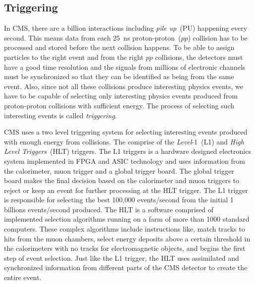 \subsection{Triggering}
In CMS, there are a billion interactions including \textit{pile up}~(PU) happening every second. This means data from each 25~ns proton-proton~($pp$) collision has to be processed and stored before the next collision happens.  To be able to assign particles to the right event and from the right  $pp$ collisions, the detectors must have a good time resolution and the signals from millions of electronic channels must be synchronized so  that they can be identified as being from the same event.
Also, since not all these collisions produce interesting physics events, we have to be capable of selecting only interesting physics events produced from proton-proton collisions with sufficient  energy. The process of selecting such interesting events is called \textit{triggering}.
\par 
CMS uses a two level triggering system for selecting interesting events produced with enough energy from collisions.
The comprise of the \textit{Level}-1~(L1) and \textit{High Level Triggers}~(HLT) triggers.
\newline
The L1 triggers is a hardware designed electronics system implemented in FPGA and ASIC technology and uses information from the calorimeter, muon trigger and a global trigger board. The global trigger board makes the final decision based on the calorimeter and muon triggers to reject or keep an event for further processing at the HLT trigger. The L1 trigger is responsible for selecting the best 100,000 events/second from the initial 1 billions events/second produced. %
\newline
The HLT is a software comprised of implemented selection algorithms running on a farm of more than 1000 standard computers. %
These complex algorithms include instructions like, match tracks to hits from the muon chambers, select energy deposits above a certain threshold in the calorimeters with no tracks for electromagnetic objects, and begins the first step of event selection. Just like the L1 trigger, the HLT  uses assimilated and synchronized information from different parts of the CMS detector to create the entire event. 
